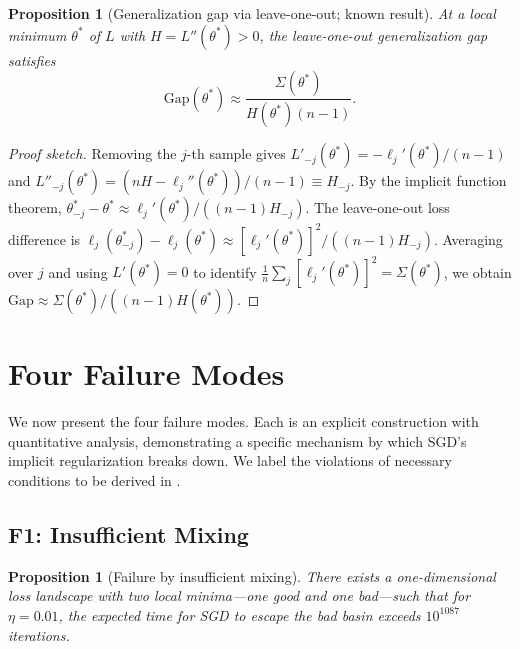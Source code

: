 \documentclass[11pt,a4paper]{article}
\newtheorem{proposition}[theorem]{Proposition}
\begin{document}
\begin{proposition}[Generalization gap via leave-one-out;
  known result]
\label{prop:gap}
At a local minimum $\theta^*$ of $L$ with $H=L''(\theta^*)>0$, the
leave-one-out generalization gap satisfies
\begin{equation}\label{eq:gap}
  \mathrm{Gap}(\theta^*) \approx \frac{\Sigma(\theta^*)}{H(\theta^*)(n-1)}.
\end{equation}
\end{proposition}

\begin{proof}[Proof sketch]
Removing the $j$-th sample gives $L'_{-j}(\theta^*) = -\ell_j'(\theta^*)/(n-1)$
and $L''_{-j}(\theta^*) = (nH - \ell_j''(\theta^*))/(n-1) \equiv H_{-j}$.
By the implicit function theorem,
$\theta^*_{-j} - \theta^* \approx \ell_j'(\theta^*)/((n-1)H_{-j})$.
The leave-one-out loss difference is
$\ell_j(\theta^*_{-j}) - \ell_j(\theta^*)
 \approx [\ell_j'(\theta^*)]^2/((n-1)H_{-j})$.
Averaging over $j$ and using $L'(\theta^*)=0$ to identify
$\frac{1}{n}\sum_j[\ell_j'(\theta^*)]^2 = \Sigma(\theta^*)$, we obtain
$\mathrm{Gap} \approx \Sigma(\theta^*)/((n-1)H(\theta^*))$.
\end{proof}

\section{Four Failure Modes}
\label{sec:failure}

We now present the four failure modes.  Each is an explicit construction with
quantitative analysis, demonstrating a specific mechanism by which SGD's
implicit regularization breaks down.  We label
the violations of necessary conditions to be derived in .

\subsection{F1: Insufficient Mixing}
\label{sec:f1}

\begin{proposition}[Failure by insufficient mixing]
\label{prop:f1}
There exists a one-dimensional loss landscape with two local minima---one good
and one bad---such that for $\eta = 0.01$, the expected time for SGD to escape
the bad basin exceeds $10^{1087}$ iterations.
\end{proposition}
\end{document}
